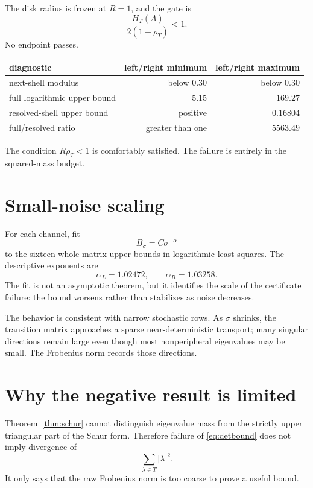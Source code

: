 \documentclass[11pt]{article}
\theoremstyle{remark}\newtheorem{remark}[theorem]{Remark}
\begin{document}
The disk radius is frozen at $R=1$, and the gate is
\begin{equation}
 \frac{H_T(A)}{2(1-\rho_T)}<1.
\end{equation}
No endpoint passes.

\begin{center}
\begin{tabular}{lrr}
\toprule
diagnostic & left/right minimum & left/right maximum\\
\midrule
next-shell modulus & below $0.30$ & below $0.30$\\
full logarithmic upper bound & $5.15$ & $169.27$\\
resolved-shell upper bound & positive & $0.16804$\\
full/resolved ratio & greater than one & $5563.49$\\
\bottomrule
\end{tabular}
\end{center}

The condition $R\rho_T<1$ is comfortably satisfied. The failure is entirely
in the squared-mass budget.

\section{Small-noise scaling}

For each channel, fit
\begin{equation}
 B_\sigma=C\sigma^{-\alpha}
\end{equation}
to the sixteen whole-matrix upper bounds in logarithmic least squares. The
descriptive exponents are
\[
 \alpha_L=1.02472,\qquad \alpha_R=1.03258.
\]
The fit is not an asymptotic theorem, but it identifies the scale of the
certificate failure: the bound worsens rather than stabilizes as noise
decreases.

The behavior is consistent with narrow stochastic rows. As $\sigma$ shrinks,
the transition matrix approaches a sparse near-deterministic transport;
many singular directions remain large even though most nonperipheral
eigenvalues may be small. The Frobenius norm records those directions.

\section{Why the negative result is limited}

Theorem~\ref{thm:schur} cannot distinguish eigenvalue mass from the strictly
upper triangular part of the Schur form. Therefore failure of
\eqref{eq:detbound} does not imply divergence of
\[
 \sum_{\lambda\in T}|\lambda|^2.
\]
It only says that the raw Frobenius norm is too coarse to prove a useful
bound.
\end{document}
